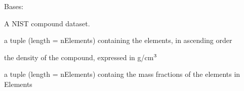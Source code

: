 \documentclass[letterpaper,10pt,english,openany,oneside]{sphinxmanual}
\begin{document}
\begin{fulllineitems}
\label{\detokenize{api/nist:dxraylib.xraylib_nist_compounds.compoundDataNIST}}
\pysigstartsignatures
{}
\pysigstopsignatures
\sphinxAtStartPar
Bases: 

\sphinxAtStartPar
A NIST compound dataset.

\begin{fulllineitems}
\label{\detokenize{api/nist:dxraylib.xraylib_nist_compounds.compoundDataNIST.Elements}}
\pysigstartsignatures
{}
\pysigstopsignatures
\sphinxAtStartPar
a tuple (length = nElements) containing the elements, in ascending order

\end{fulllineitems}


\begin{fulllineitems}
\label{\detokenize{api/nist:dxraylib.xraylib_nist_compounds.compoundDataNIST.density}}
\pysigstartsignatures
{}
\pysigstopsignatures
\sphinxAtStartPar
the density of the compound, expressed in g/cm\(\sp{\text{3}}\)

\end{fulllineitems}


\begin{fulllineitems}
\label{\detokenize{api/nist:dxraylib.xraylib_nist_compounds.compoundDataNIST.massFractions}}
\pysigstartsignatures
{}
\pysigstopsignatures
\sphinxAtStartPar
a tuple (length = nElements) containg the mass fractions of the elements
in Elements


\end{fulllineitems}
\end{fulllineitems}
\end{document}
